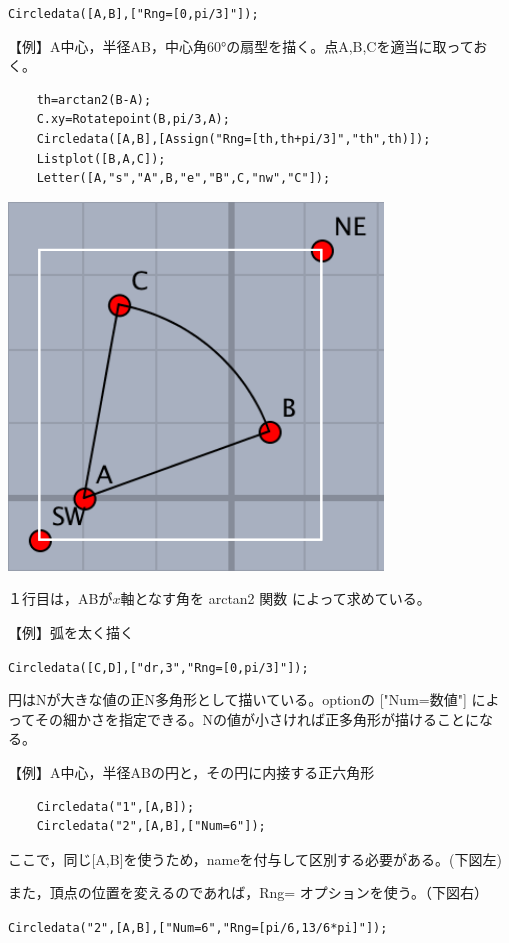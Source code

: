 \documentclass[papersize,a4paper,12pt,uplatex]{jsarticle}
\begin{document}
\begin{description}
\hspace{10mm}  \verb|Circledata([A,B],["Rng=[0,pi/3]"]); |

\vspace{\baselineskip}
【例】A中心，半径AB，中心角60°の扇型を描く。点A,B,Cを適当に取っておく。
  
\begin{verbatim}
    th=arctan2(B-A);
    C.xy=Rotatepoint(B,pi/3,A);
    Circledata([A,B],[Assign("Rng=[th,th+pi/3]","th",th)]);
    Listplot([B,A,C]); 
    Letter([A,"s","A",B,"e","B",C,"nw","C"]);
\end{verbatim}

\begin{center}
\includegraphics[bb=0.00 0.00 180.01 177.01,width=4cm"] {Fig/circledata3.pdf}\hspace{12mm}  
\end{center}

１行目は，ABが$x$軸となす角を arctan2 関数 によって求めている。

\vspace{\baselineskip}
【例】弧を太く描く

    \verb|Circledata([C,D],["dr,3","Rng=[0,pi/3]"]);|

  円はNが大きな値の正N多角形として描いている。optionの ["Num=数値"] によってその細かさを指定できる。Nの値が小さければ正多角形が描けることになる。

\vspace{\baselineskip}
【例】A中心，半径ABの円と，その円に内接する正六角形
\begin{verbatim}
    Circledata("1",[A,B]);
    Circledata("2",[A,B],["Num=6"]);
\end{verbatim}
ここで，同じ[A,B]を使うため，nameを付与して区別する必要がある。(下図左)

また，頂点の位置を変えるのであれば，Rng= オプションを使う。（下図右）

 \verb|Circledata("2",[A,B],["Num=6","Rng=[pi/6,13/6*pi]"]);|

\hspace{10mm} 
\hspace{5mm}  


\end{description}
\end{document}

